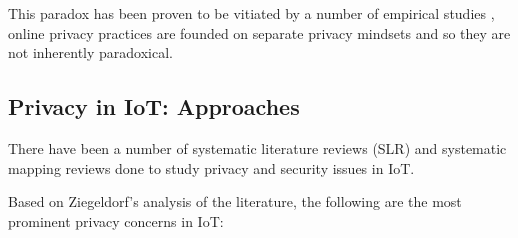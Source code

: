 \documentclass[manuscript,natbib=false]{acmart}
\begin{document}
This paradox has been proven to be vitiated by a number of empirical studies \cite{dienlin2015privacy, xie2019consumers, SCHWAIG20131, sannon2018privacy},
online privacy practices are founded on separate privacy mindsets and so
they are not inherently paradoxical.

\subsection{Privacy in IoT: Approaches}

There have been a number of systematic literature reviews (SLR) \cite{Gupta2022Privacy, Kuhtreiber2022survey, sicari2015security, LinSurvey}
and systematic mapping reviews \cite{porras2018security, ahmed2019aspects}
done to study privacy and security issues in IoT.

Based on Ziegeldorf's \cite{ziegeldorf2014privacy} analysis of the literature,
the following are the most prominent privacy concerns in IoT:
\end{document}

